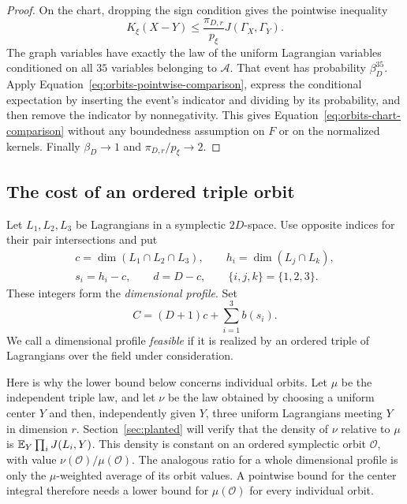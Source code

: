 \begin{proof}
On the chart, dropping the sign condition gives the pointwise inequality
\begin{equation}
 K_\xi(X-Y)\le
 \frac{\pi_{D,r}}{p_\xi}J(\Gamma_X,\Gamma_Y).
 \label{eq:orbits-pointwise-comparison}
\end{equation}
The graph variables have exactly the law of the uniform Lagrangian
variables conditioned on all $35$ variables belonging to $\mathcal A$.
That event has probability $\beta_D^{35}$.  Apply
Equation~\eqref{eq:orbits-pointwise-comparison}, express the conditional
expectation by inserting the event's indicator and dividing by its
probability, and then remove the indicator by nonnegativity.  This gives
Equation~\eqref{eq:orbits-chart-comparison} without any boundedness
assumption on $F$ or on the normalized kernels.  Finally
$\beta_D\to1$ and $\pi_{D,r}/p_\xi\to2$.
\end{proof}

\subsection{The cost of an ordered triple orbit}

Let $L_1,L_2,L_3$ be Lagrangians in a symplectic $2D$-space.  Use opposite
indices for their pair intersections and put
\begin{equation}
 \begin{gathered}
 c=\dim(L_1\cap L_2\cap L_3),\qquad
 h_i=\dim(L_j\cap L_k),\\
 s_i=h_i-c,\qquad d=D-c,
 \qquad \{i,j,k\}=\{1,2,3\}.
 \end{gathered}
 \label{eq:orbits-profile}
\end{equation}
These integers form the \emph{dimensional profile}.  Set
\begin{equation}
 C=(D+1)c+\sum_{i=1}^3b(s_i).
 \label{eq:orbits-profile-cost}
\end{equation}
We call a dimensional profile \emph{feasible} if it is realized by an
ordered triple of Lagrangians over the field under consideration.

Here is why the lower bound below concerns individual orbits. Let
\(\mu\) be the independent triple law, and let \(\nu\) be the law
obtained by choosing a uniform center \(Y\) and then, independently
given \(Y\), three uniform Lagrangians meeting \(Y\) in dimension \(r\).
Section~\ref{sec:planted} will verify that the density of \(\nu\)
relative to \(\mu\) is \(\mathbb E_Y\prod_i J(L_i,Y)\). This density is
constant on an ordered symplectic orbit \(\mathcal O\), with value
\(\nu(\mathcal O)/\mu(\mathcal O)\). The analogous ratio for a whole
dimensional profile is only the \(\mu\)-weighted average of its orbit
values. A pointwise bound for the center integral therefore needs a
lower bound for \(\mu(\mathcal O)\) for every individual orbit.

